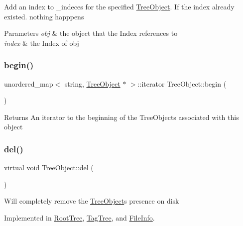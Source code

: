 Add an index to \+\_\+indeces for the specified \mbox{\hyperlink{classTreeObject}{Tree\+Object}}. If the index already existed. nothing happpens 
\begin{DoxyParams}{Parameters}
{\em obj} & the object that the Index references to \\
\hline
{\em index} & the Index of obj \\
\hline
\end{DoxyParams}
\mbox{\label{classTreeObject_af8bb5e54c0a13e1e0e5be409153ab6d8}} 
\subsubsection{\texorpdfstring{begin()}{begin()}}
{\footnotesize\ttfamily unordered\+\_\+map$<$ string, \mbox{\hyperlink{classTreeObject}{Tree\+Object}} $\ast$ $>$\+::iterator Tree\+Object\+::begin (\begin{DoxyParamCaption}{ }\end{DoxyParamCaption})}

\begin{DoxyReturn}{Returns}
An iterator to the beginning of the Tree\+Objects associated with this object 
\end{DoxyReturn}
\mbox{\label{classTreeObject_af390b7479aa972888e594c07a85740b6}} 
\subsubsection{\texorpdfstring{del()}{del()}}
{\footnotesize\ttfamily virtual void Tree\+Object\+::del (\begin{DoxyParamCaption}{ }\end{DoxyParamCaption})\hspace{0.3cm}{\ttfamily [pure virtual]}}

Will completely remove the \mbox{\hyperlink{classTreeObject}{Tree\+Object}}\textquotesingle{}s presence on disk 

Implemented in \mbox{\hyperlink{classRootTree_ac431dc04b767fc66791c251d8173650d}{Root\+Tree}}, \mbox{\hyperlink{classTagTree_ad8108969f4d28b938e55c8339f19db35}{Tag\+Tree}}, and \mbox{\hyperlink{classFileInfo_a2ca34d945ed1208f227a249ba72ee427}{File\+Info}}.

